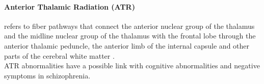\documentclass[../structure.tex]{subfiles}
\begin{document}
		\paragraph{Anterior Thalamic Radiation (ATR)}
		refers to fiber pathways that connect the anterior nuclear group of the thalamus and the midline nuclear group of the thalamus with the frontal lobe through the anterior thalamic peduncle, the anterior limb of the internal capsule and other parts of the cerebral white matter \cite{Washington1994}\cite{Grimm2018}.\\
		ATR abnormalities have a possible link with cognitive abnormalities and negative symptoms in schizophrenia\cite{Mamah2010}.
		
\end{document}
